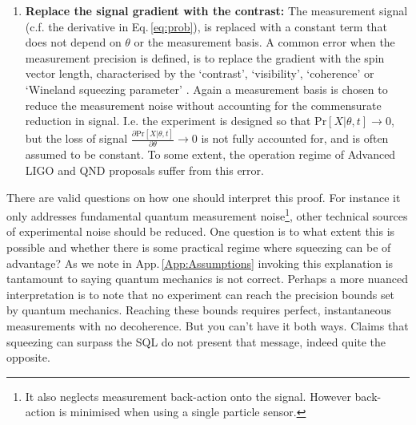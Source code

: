 \documentclass[reqno]{amsart}
\def\func#1#2{\mathrm{#1}\left[#2\right]}
\begin{document}
\begin{enumerate}
\item \textbf{Replace the signal gradient with the contrast:} The measurement signal (c.f. the derivative in Eq.\,\eqref{eq:prob}), is replaced with a constant term that does not depend on $\theta$ or the measurement basis. A common error when the measurement precision is defined, is to replace the gradient with the spin vector length, characterised by the `contrast', `visibility', `coherence' or `Wineland squeezing parameter' \cite{Meyer2001, Esteve2008, Gross2010, Leroux2010, Leroux2010a, Riedel2010, Hosten2016, PedrozoPenafiel2020, Malia2020, Malia2022}. Again a measurement basis is chosen to reduce the measurement noise without accounting for the commensurate reduction in signal. I.e. the experiment is designed so that $\func{Pr}{X|\theta,t} \rightarrow 0$, but the loss of signal $\frac{\partial \func{Pr}{X|\theta,t}}{\partial \theta} \rightarrow 0$ is not fully accounted for, and is often assumed to be constant. To some extent, the operation regime of Advanced LIGO \cite{Aasi2015, Tse2022} and QND proposals \cite{Braginsky1980, Kimble2001} suffer from this error.

\end{enumerate}


There are valid questions on how one should interpret this proof. For instance it only addresses fundamental quantum measurement noise\footnote{It also neglects measurement back-action onto the signal. However back-action is minimised when using a single particle sensor.}, other technical sources of experimental noise should be reduced. One question is to what extent this is possible and whether there is some practical regime where squeezing can be of advantage? As we note in App.\,\ref{App:Assumptions} invoking this explanation is tantamount to saying quantum mechanics is not correct. Perhaps a more nuanced interpretation is to note that no experiment can reach the precision bounds set by quantum mechanics. Reaching these bounds requires perfect, instantaneous measurements with no decoherence. But you can't have it both ways. Claims that squeezing can surpass the SQL do not present that message, indeed quite the opposite.
\end{document}
